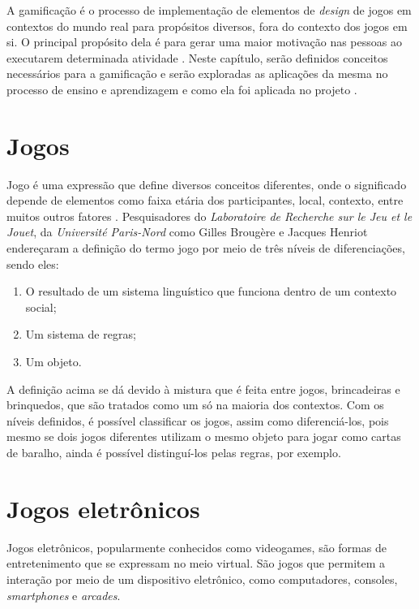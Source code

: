 A gamificação é o processo de implementação de elementos de \textit{design} de jogos em contextos do mundo real para propósitos diversos, fora do contexto dos jogos em si. O principal propósito dela é para gerar uma maior motivação nas pessoas ao executarem determinada atividade \cite{gamification_motivates}. Neste capítulo, serão definidos conceitos necessários para a gamificação e serão exploradas as aplicações da mesma no processo de ensino e aprendizagem e como ela foi aplicada no projeto \appName.

\section{Jogos}

Jogo é uma expressão que define diversos conceitos diferentes, onde o significado depende de elementos como faixa etária dos participantes, local, contexto, entre muitos outros fatores \cite{jogos}. Pesquisadores do \textit{Laboratoire de Recherche sur le Jeu et le Jouet}, da \textit{Université Paris-Nord} como Gilles Brougère \cite{gilles_jogos} e Jacques Henriot \cite{jacques_jeu} endereçaram a definição do termo jogo por meio de três níveis de diferenciações, sendo eles:

\begin{enumerate}
    \item O resultado de um sistema linguístico que funciona dentro de um contexto social;
    \item Um sistema de regras;
    \item Um objeto.
\end{enumerate}

A definição acima se dá devido à mistura que é feita entre jogos, brincadeiras e brinquedos, que são tratados como um só na maioria dos contextos. Com os níveis definidos, é possível classificar os jogos, assim como diferenciá-los, pois mesmo se dois jogos diferentes utilizam o mesmo objeto para jogar como cartas de baralho, ainda é possível distinguí-los pelas regras, por exemplo.

\section{Jogos eletrônicos}

Jogos eletrônicos, popularmente conhecidos como videogames, são formas de entretenimento que se expressam no meio virtual. São jogos que permitem a interação por meio de um dispositivo eletrônico, como computadores, consoles, \textit{smartphones} e \textit{arcades}.

